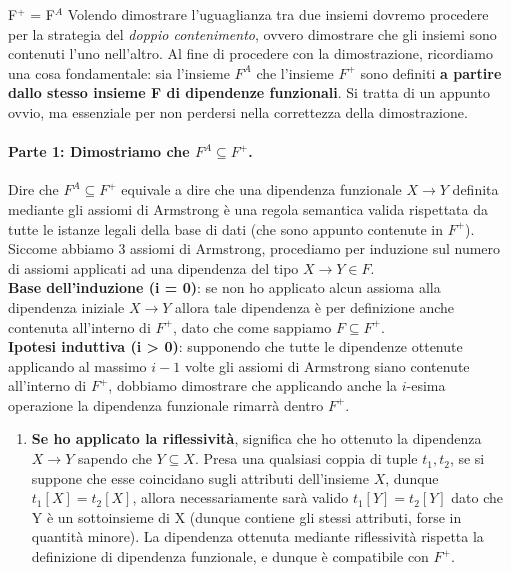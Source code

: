 \documentclass[12pt]{report}
\newcommand{\ra}{
	\rightarrow
}
\begin{document}
	\begin{dimostrazione}{F$^+$ = F$^A$}{}
		Volendo dimostrare l'uguaglianza tra due insiemi dovremo procedere per la strategia del \textit{doppio contenimento}, ovvero dimostrare che gli insiemi sono contenuti l'uno nell'altro. Al fine di procedere con la dimostrazione, ricordiamo una cosa fondamentale: sia l'insieme $F^A$ che l'insieme $F^+$ sono definiti \textbf{a partire dallo stesso insieme F di dipendenze funzionali}. Si tratta di un appunto ovvio, ma essenziale per non perdersi nella correttezza della dimostrazione.
		
		\paragraph{Parte 1: Dimostriamo che $F^A \subseteq F^+$.}
		Dire che $F^A \subseteq F^+$ equivale a dire che una dipendenza funzionale $X \ra Y$ definita mediante gli assiomi di Armstrong è una regola semantica valida rispettata da tutte le istanze legali della base di dati (che sono appunto contenute in $F^+$). Siccome abbiamo 3 assiomi di Armstrong, procediamo per induzione sul numero di assiomi applicati ad una dipendenza del tipo $X \ra Y \in F$.\\
		
		\textbf{Base dell'induzione (i = 0)}: se non ho applicato alcun assioma alla dipendenza iniziale $X \ra Y$ allora tale dipendenza è per definizione anche contenuta all'interno di $F^+$, dato che come sappiamo $F \subseteq F^+$.\\
		
		\textbf{Ipotesi induttiva (i > 0)}: supponendo che tutte le dipendenze ottenute applicando al massimo $i-1$ volte gli assiomi di Armstrong siano contenute all'interno di $F^+$, dobbiamo dimostrare che applicando anche la $i$-esima operazione la dipendenza funzionale rimarrà dentro $F^+$.
		\begin{enumerate}
			\item \textbf{Se ho applicato la riflessività}, significa che ho ottenuto la dipendenza $X \ra Y$ sapendo che $Y \subseteq X$. Presa una qualsiasi coppia di tuple $t_1, t_2$, se si suppone che esse coincidano sugli attributi dell'insieme $X$, dunque $t_1[X] = t_2[X]$, allora necessariamente sarà valido $t_1[Y] = t_2[Y]$ dato che Y è un sottoinsieme di X (dunque contiene gli stessi attributi, forse in quantità minore). La dipendenza ottenuta mediante riflessività rispetta la definizione di dipendenza funzionale, e dunque è compatibile con $F^+$.
			

\end{enumerate}
\end{dimostrazione}
\end{document}
